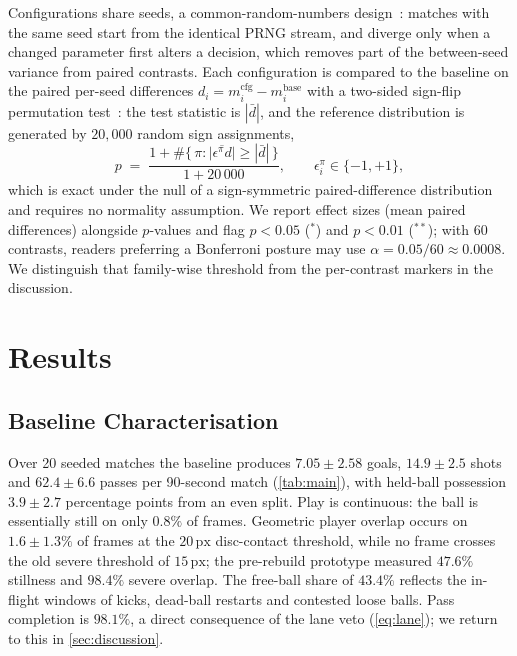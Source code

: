 \documentclass[10pt,twocolumn]{article}
\newcommand{\px}{\ensuremath{\,\mathrm{px}}}
\begin{document}
Configurations share seeds, a common-random-numbers
design~\cite{law2015simulation}: matches with the same seed start from the
identical PRNG stream, and diverge only when a changed parameter first
alters a decision, which removes part of the between-seed variance from
paired contrasts. Each configuration is compared to the baseline on the
paired per-seed differences $d_i = m^{\text{cfg}}_i - m^{\text{base}}_i$
with a two-sided sign-flip permutation test~\cite{good2005permutation}: the
test statistic is $|\bar d|$, and the reference distribution is generated
by $20{,}000$ random sign assignments,
\begin{equation}\label{eq:perm}
p \;=\; \frac{1 + \#\bigl\{\,\pi : \bigl|\overline{\epsilon^{\pi} d}\bigr| \ge |\bar d|\,\bigr\}}{1 + 20\,000},
\qquad \epsilon^{\pi}_i \in \{-1,+1\},
\end{equation}
which is exact under the null of a sign-symmetric paired-difference
distribution and requires no normality assumption. We report effect sizes
(mean paired differences) alongside $p$-values and flag $p<0.05$ ($^{*}$)
and $p<0.01$ ($^{**}$); with 60 contrasts, readers preferring a Bonferroni
posture may use $\alpha = 0.05/60 \approx 0.0008$. We distinguish that
family-wise threshold from the per-contrast markers in the discussion.

\section{Results}\label{sec:results}

\subsection{Baseline Characterisation}\label{sec:baseline}

Over 20 seeded matches the baseline produces $7.05 \pm 2.58$ goals,
$14.9 \pm 2.5$ shots and $62.4 \pm 6.6$ passes per 90-second match
(\cref{tab:main}), with held-ball possession $3.9 \pm 2.7$ percentage
points from an even split. Play is continuous: the ball is essentially still
on only $0.8\%$ of frames. Geometric player overlap occurs on
$1.6 \pm 1.3\%$ of frames at the $20\px$ disc-contact threshold, while no
frame crosses the old severe threshold of $15\px$; the pre-rebuild prototype
measured $47.6\%$ stillness and $98.4\%$ severe overlap. The free-ball share
of $43.4\%$ reflects the in-flight windows of kicks, dead-ball restarts and
contested loose balls. Pass completion is $98.1\%$, a direct consequence of
the lane veto (\cref{eq:lane}); we return to this in \cref{sec:discussion}.
\end{document}
